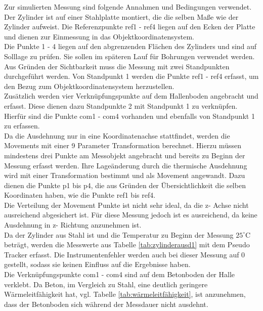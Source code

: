 Zur simulierten Messung sind folgende Annahmen und Bedingungen verwendet.\\
Der Zylinder ist auf einer Stahlplatte montiert, die die selben Maße wie der Zylinder aufweist. Die Referenzpunkte ref1 - ref4 liegen auf den Ecken der Platte und dienen zur Einmessung in das Objektkoordinatensystem.\\
Die Punkte 1 - 4 liegen auf den abgrenzenden Flächen des Zylinders und sind auf Solllage zu prüfen. Sie sollen im späteren Lauf für Bohrungen verwendet werden.\\
Aus Gründen der Sichtbarkeit muss die Messung mit zwei Standpunkten durchgeführt werden. Von Standpunkt 1 werden die Punkte ref1 - ref4 erfasst, um den Bezug zum Objektkoordinatensystem herzustellen.\\
Zusätzlich werden vier Verknüpfungspunkte auf dem Hallenboden angebracht und erfasst. Diese dienen dazu Standpunkte 2 mit Standpunkt 1 zu verknüpfen. Hierfür sind die Punkte com1 - com4 vorhanden und ebenfalls von Standpunkt 1 zu erfassen.\\
Da die Ausdehnung nur in eine Koordinatenachse stattfindet, werden die Movements mit einer 9 Parameter Transformation berechnet. Hierzu müssen mindestens drei Punkte am Messobjekt angebracht und bereits zu Beginn der Messung erfasst werden. Ihre Lageänderung durch die thermische Ausdehnung wird mit einer Transformation bestimmt und als Movement angewandt. Dazu dienen die Punkte p1 bis p4, die aus Gründen der Übersichtlichkeit die selben Koordinaten haben, wie die Punkte ref1 bis ref4.\\
Die Verteilung der Movement Punkte ist nicht sehr ideal, da die z- Achse nicht ausreichend abgesichert ist. Für diese Messung jedoch ist es ausreichend, da keine Ausdehnung in z- Richtung anzunehmen ist.\\
Da der Zylinder aus Stahl ist und die Temperatur zu Beginn der Messung $25^\circ\text{C}$ beträgt, werden die Messwerte aus Tabelle \ref{tab:zylinderausd1} mit dem Pseudo Tracker erfasst. Die Instrumentenfehler werden auch bei dieser Messung auf 0 gestellt, sodass sie keinen Einfluss auf die Ergebnisse haben.\\
Die Verknüpfungspunkte com1 - com4 sind auf dem Betonboden der Halle verklebt. Da Beton, im Vergleich zu Stahl, eine deutlich geringere Wärmeleitfähigkeit hat, vgl. Tabelle \ref{tab:wärmeleitfähigkeit}, ist anzunehmen, dass der Betonboden sich während der Messdauer nicht ausdehnt.

